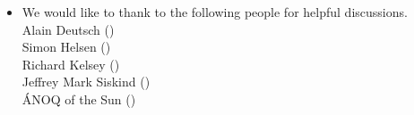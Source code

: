 \begin{itemize}
\item
We would like to thank to the following people for helpful discussions.\\
\hspace*{2em}Alain Deutsch ()\\
\hspace*{2em}Simon Helsen ()\\
\hspace*{2em}Richard Kelsey ()\\
\hspace*{2em}Jeffrey Mark Siskind ()\\
\hspace*{2em}\'{A}NOQ of the Sun ()
\end{itemize}
